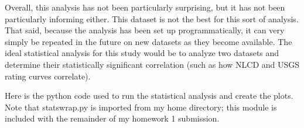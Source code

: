 \documentclass[10pt]{article}
\begin{document}
Overall, this analysis has not been particularly surprising, but it has not been particularly informing either. This dataset is not the best for this sort of analysis. That said, because the analysis has been set up programmatically, it can very simply be repeated in the future on new datasets as they become available. The ideal statistical analysis for this study would be to analyze two datasets and determine their statistically significant correlation (such as how NLCD and USGS rating curves correlate). 


\vspace{2ex}
Here is the python code used to run the statistical analysis and create the plots. Note that statswrap.py is imported from my home directory; this module is included with the remainder of my homework 1 submission. \\


\end{document}
